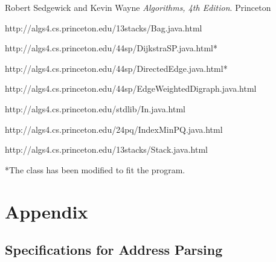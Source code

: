 \documentclass[a4paper,10pt,titlepage]{article}
\begin{document}
	\begin{thebibliography}{9}
  	Robert Sedgewick and Kevin Wayne
  	\emph{Algorithms, 4th Edition}.
  	Princeton

	http://algs4.cs.princeton.edu/13stacks/Bag.java.html
	
	http://algs4.cs.princeton.edu/44sp/DijkstraSP.java.html*  	
	
	http://algs4.cs.princeton.edu/44sp/DirectedEdge.java.html*
	
	http://algs4.cs.princeton.edu/44sp/EdgeWeightedDigraph.java.html
  	
	http://algs4.cs.princeton.edu/stdlib/In.java.html
	
	http://algs4.cs.princeton.edu/24pq/IndexMinPQ.java.html
	
	 												http://algs4.cs.princeton.edu/13stacks/Stack.java.html
	
	\end{thebibliography}
	*The class has been modified to fit the program.

	\newpage

	\section{Appendix}

	\subsection{Specifications for Address Parsing}
\end{document}
